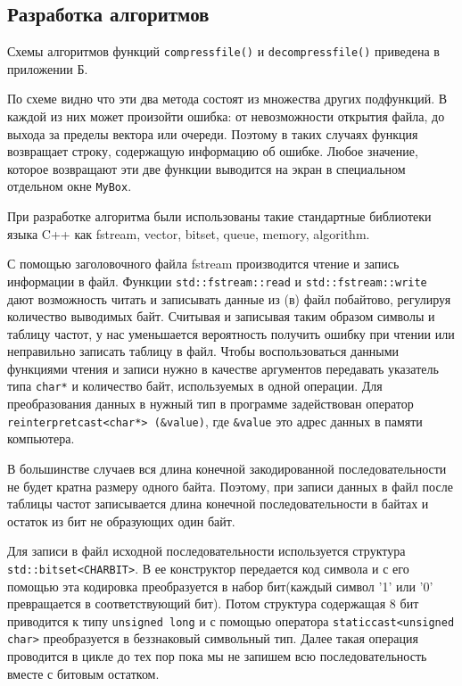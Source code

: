 \subsection{Разработка алгоритмов}


Схемы алгоритмов функций \texttt{compress{\textunderscore}file()} и \texttt{decompress{\textunderscore}file()} приведена в приложении Б.



По схеме видно что эти два метода состоят из множества других подфункций.
В каждой из них может произойти ошибка: от невозможности открытия файла, до выхода за пределы вектора или очереди.
Поэтому в таких случаях функция возвращает строку, содержащую информацию об ошибке.
Любое значение, которое возвращают эти две функции выводится на экран в специальном отдельном окне \texttt{MyBox}.



При разработке алгоритма были использованы такие стандартные библиотеки языка C++ как fstream, vector, bitset\cite{bitset}, queue, memory, algorithm.



С помощью заголовочного файла fstream производится чтение и запись информации в файл\cite{lafore}. 
Функции \texttt{std::fstream::read} и \texttt{std::fstream::write}\cite{stream} дают возможность читать и записывать данные из (в) файл побайтово, регулируя количество выводимых байт.
Считывая и записывая таким образом символы и таблицу частот, у нас уменьшается вероятность получить ошибку при чтении или неправильно записать таблицу в файл.
Чтобы воспользоваться данными функциями чтения и записи нужно в качестве аргументов передавать указатель типа \texttt{char*} и количество байт, используемых в одной операции\cite{stream}.
Для преобразования данных в нужный тип в программе задействован оператор \texttt{reinterpret{\textunderscore}cast<char*> (\&value)}, где \texttt{\&value} это адрес данных в памяти компьютера.



В большинстве случаев вся длина конечной закодированной последовательности не будет кратна размеру одного байта.
Поэтому, при записи данных в файл после таблицы частот записывается длина конечной последовательности в байтах и остаток из бит не образующих один байт.



Для записи в файл исходной последовательности используется структура \texttt{std::bitset<CHAR{\textunderscore}BIT>}\cite{bitset}.
В ее конструктор передается код символа и с его помощью эта кодировка преобразуется в набор бит(каждый символ '1' или '0' превращается в соответствующий бит).
Потом структура содержащая 8 бит приводится к типу \texttt{unsigned long} и с помощью оператора \texttt{static{\textunderscore}cast<unsigned char>} преобразуется в беззнаковый символьный тип.
Далее такая операция проводится в цикле до тех пор пока мы не запишем всю последовательность вместе с битовым остатком.



